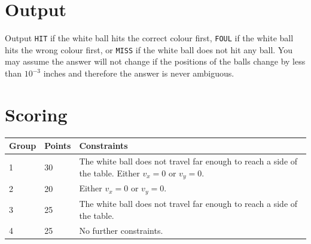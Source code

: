 \section*{Output}
Output \texttt{HIT} if the white ball hits the correct colour first,
\texttt{FOUL} if the white ball hits the wrong colour first, or
\texttt{MISS} if the white ball does not hit any ball.
You may assume the answer will not change if the positions of the balls change by less than $10^{-3}$ inches and therefore the answer is never ambiguous.

\section*{Scoring}
\begin{tabular}{|l|l|l|}
\hline
Group & Points & Constraints \\ \hline
1     & 30     & The white ball does not travel far enough to reach a side of the table. Either $v_x = 0$ or $v_y = 0$. \\ \hline
2     & 20     & Either $v_x = 0$ or $v_y = 0$. \\ \hline
3     & 25     & The white ball does not travel far enough to reach a side of the table. \\ \hline
4     & 25     & No further constraints. \\ \hline
\end{tabular}

